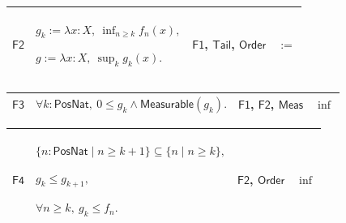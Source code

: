 \documentclass[11pt]{amsart}
\newlength{\FTCFourColumnBody}
\begin{document}
{\noindent
\begin{tabular}{|@{}>{\centering\arraybackslash}m{0.078431\FTCFourColumnBody}|>{\centering\arraybackslash}m{0.535947\FTCFourColumnBody}|>{\centering\arraybackslash}m{0.281045\FTCFourColumnBody}|>{\centering\arraybackslash}m{0.104575\FTCFourColumnBody}|}\hline
\hypertarget{proof:F2}{$\displaystyle \textsf{F2}$} & $\displaystyle g_k:=\lambda x:X,\ \inf_{n\ge k}f_n(x),$\par
$\displaystyle g:=\lambda x:X,\ \sup_k g_k(x).$ & \hyperlink{proof:F1}{$\displaystyle \textsf{F1}$}, \hyperlink{def:Tail}{$\displaystyle \textsf{Tail}$}, \hyperlink{ax:Order}{$\displaystyle \textsf{Order}$} & $\displaystyle :=$\\ \hline
\end{tabular}%
\par\setlength{\parskip}{0pt}\nointerlineskip
\noindent
\begin{tabular}{|@{}>{\centering\arraybackslash}m{0.078431\FTCFourColumnBody}|>{\centering\arraybackslash}m{0.535947\FTCFourColumnBody}|>{\centering\arraybackslash}m{0.281045\FTCFourColumnBody}|>{\centering\arraybackslash}m{0.104575\FTCFourColumnBody}|}\hline
\hypertarget{proof:F3}{$\displaystyle \textsf{F3}$} & $\displaystyle \forall k:\textsf{PosNat},\ 0\le g_k\land\textsf{Measurable}(g_k).$ & \hyperlink{proof:F1}{$\displaystyle \textsf{F1}$}, \hyperlink{proof:F2}{$\displaystyle \textsf{F2}$}, \hyperlink{lem:Meas}{$\displaystyle \textsf{Meas}$} & $\displaystyle \inf$\\ \hline
\end{tabular}%
\par\setlength{\parskip}{0pt}\nointerlineskip
\noindent
\begin{tabular}{|@{}>{\centering\arraybackslash}m{0.078431\FTCFourColumnBody}|>{\centering\arraybackslash}m{0.535947\FTCFourColumnBody}|>{\centering\arraybackslash}m{0.281045\FTCFourColumnBody}|>{\centering\arraybackslash}m{0.104575\FTCFourColumnBody}|}\hline
\hypertarget{proof:F4}{$\displaystyle \textsf{F4}$} & $\displaystyle \{n:\textsf{PosNat}\mid n\ge k+1\}\subseteq\{n\mid n\ge k\},$\par
$\displaystyle g_k\le g_{k+1},$\par
$\displaystyle \forall n\ge k,\ g_k\le f_n.$ & \hyperlink{proof:F2}{$\displaystyle \textsf{F2}$}, \hyperlink{ax:Order}{$\displaystyle \textsf{Order}$} & $\displaystyle \inf$\\ \hline
\end{tabular}%
\par\setlength{\parskip}{0pt}\nointerlineskip
}
\end{document}
